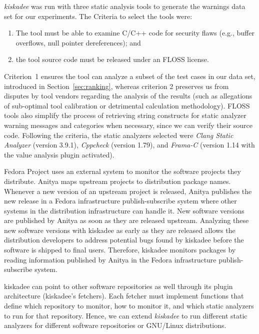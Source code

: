\textit{kiskadee} was run with three static analysis tools to generate the
warnings data set for our experiments. The Criteria to select the tools were:
\begin{enumerate}
  \item The tool must be able to examine C/C++ code for security flaws (e.g., buffer overflows, null pointer dereferences); and
  \item the tool source code must be released under an FLOSS license.
\end{enumerate}
Criterion~1 ensures the tool can analyze a subset of the test cases in our data
set, introduced in Section~\ref{sec:ranking}, whereas criterion 2 preserves us
from disputes by tool vendors regarding the analysis of the results (such as
allegations of sub-optimal tool calibration or detrimental calculation
methodology). FLOSS tools also simplify the process of retrieving string
constructs for static analyzer warning messages and categories when necessary,
since we can verify their source code. Following the criteria, the static
analyzers selected were \emph{Clang Static Analyzer} (version 3.9.1),
\emph{Cppcheck} (version 1.79), and \emph{Frama-C} (version 1.14 with the value
analysis plugin activated).

Fedora Project uses an external system to monitor the software projects they
distribute. Anitya \cite{anitya} maps upstream projects to distribution package
names. Whenever a new version of an upstream project is released, Anitya
publishes the new release in a Fedora infrastructure publish-subscribe system
where other systems in the distribution infrastructure can handle it.
New software versions are published by Anitya as soon as they are released
upstream. Analyzing these new software versions with kiskadee as early as they
are released allows the distribution developers to address potential bugs found
by kiskadee before the software is shipped to final users. Therefore, kiskadee
monitors packages by reading information published by Anitya in the Fedora
infrastructure publish-subscribe system.

kiskadee can point to other software repositories as well through its plugin
architecture (kiskadee's fetchers). Each fetcher must implement functions that
define which repository to monitor, how to monitor it, and which static
analyzers to run for that repository. Hence, we can extend \textit{kiskadee} to
run different static analyzers for different software repositories or GNU/Linux
distributions.

